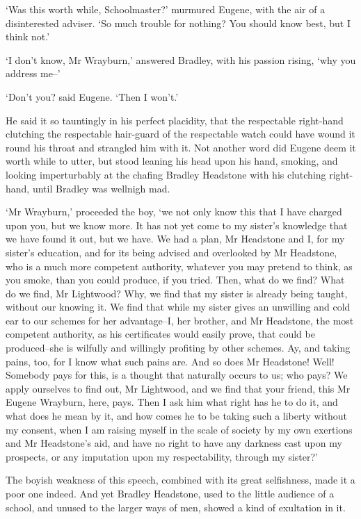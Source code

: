 ‘Was this worth while, Schoolmaster?’ murmured Eugene, with the air of
a disinterested adviser. ‘So much trouble for nothing? You should know
best, but I think not.’

‘I don’t know, Mr Wrayburn,’ answered Bradley, with his passion rising,
‘why you address me--’

‘Don’t you? said Eugene. ‘Then I won’t.’

He said it so tauntingly in his perfect placidity, that the respectable
right-hand clutching the respectable hair-guard of the respectable watch
could have wound it round his throat and strangled him with it. Not
another word did Eugene deem it worth while to utter, but stood leaning
his head upon his hand, smoking, and looking imperturbably at the
chafing Bradley Headstone with his clutching right-hand, until Bradley
was wellnigh mad.

‘Mr Wrayburn,’ proceeded the boy, ‘we not only know this that I have
charged upon you, but we know more. It has not yet come to my sister’s
knowledge that we have found it out, but we have. We had a plan, Mr
Headstone and I, for my sister’s education, and for its being advised
and overlooked by Mr Headstone, who is a much more competent authority,
whatever you may pretend to think, as you smoke, than you could produce,
if you tried. Then, what do we find? What do we find, Mr Lightwood? Why,
we find that my sister is already being taught, without our knowing
it. We find that while my sister gives an unwilling and cold ear to our
schemes for her advantage--I, her brother, and Mr Headstone, the most
competent authority, as his certificates would easily prove, that could
be produced--she is wilfully and willingly profiting by other schemes.
Ay, and taking pains, too, for I know what such pains are. And so does
Mr Headstone! Well! Somebody pays for this, is a thought that naturally
occurs to us; who pays? We apply ourselves to find out, Mr Lightwood,
and we find that your friend, this Mr Eugene Wrayburn, here, pays. Then
I ask him what right has he to do it, and what does he mean by it, and
how comes he to be taking such a liberty without my consent, when I
am raising myself in the scale of society by my own exertions and Mr
Headstone’s aid, and have no right to have any darkness cast upon my
prospects, or any imputation upon my respectability, through my sister?’

The boyish weakness of this speech, combined with its great selfishness,
made it a poor one indeed. And yet Bradley Headstone, used to the little
audience of a school, and unused to the larger ways of men, showed a
kind of exultation in it.

